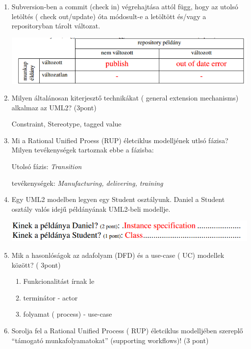 \begin{enumerate}
	\item Subversion-ben a commit (check in) végrehajtása attól függ, hogy az utolsó letöltés ( check out/update) óta módosult-e a letöltött és/vagy a repositoryban tárolt változat.

		\begin{center}
			\includegraphics[scale=0.7]{img/table15}
		\end{center}

	\item Milyen általánosan kiterjesztő technikákat ( general extension mechanisms) alkalmaz az UML2? (3pont)

		Constraint, Stereotype, tagged value

	\item Mi a Rational Unified Proess (RUP) életciklus modelljének utlsó fázisa? Milyen tevékenységek tartoznak ebbe a fázisba:

	Utolsó fázis: \textit{Transition}

	tevékenységek: \textit{Manufacturing, delivering, training}

	\item Egy UML2 modelben legyen egy Student osztályunk. Daniel a Student osztály valós idejű példányának UML2-beli modellje.

		\begin{center}
			\includegraphics[scale=0.7]{img/table16}
		\end{center}

	\item Mik a hasonlóságok az adafolyam (DFD) és a use-case ( UC) modellek között? ( 3pont)

		\begin{enumerate}
			\item Funkcionalitást írnak le
			\item terminátor - actor
			\item folyamat ( process) - use-case
		\end{enumerate}

	\item Sorolja fel a Rational Unified Process ( RUP) életciklus modelljében szereplő ``támogató munkafolyamatokat'' (supporting workflows)! (3 pont)


\end{enumerate}

